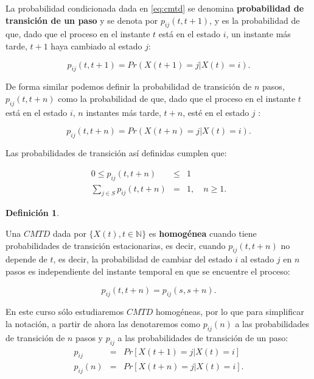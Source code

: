 \documentclass[
]{book}
\newenvironment{yellowbox}{
  \definecolor{shadecolor}{rgb}{210, 180, 140}  
  \color{black}
  \begin{shaded}}
 {\end{shaded}}
\theoremstyle{definition}
\newtheorem{definition}{Definición}[chapter]
\theoremstyle{definition}
\theoremstyle{definition}
\theoremstyle{definition}
\theoremstyle{remark}
\begin{document}
La probabilidad condicionada dada en \eqref{eq:cmtd} se denomina \textbf{probabilidad de transición de un paso} y se denota por \(p_{ij}(t,t+1)\), y es la probabilidad de que, dado que el proceso en el instante \(t\) está en el estado \(i\), un instante más tarde, \(t+1\) haya cambiado al estado \(j\):

\[p_{ij}(t,t+1)=Pr(X(t+1) = j | X(t) = i).\]

De forma similar podemos definir la probabilidad de transición de \(n\) pasos, \(p_{ij}(t,t+n)\) como la probabilidad de que, dado que el proceso en el instante \(t\) está en el estado \(i\), \(n\) instantes más tarde, \(t+n\), esté en el estado \(j\) :

\begin{equation}
p_{ij}(t,t+n)=Pr(X(t+n) = j | X(t) = i).
\label{eq:probtrans}
\end{equation}

Las probabilidades de transición así definidas cumplen que:

\begin{eqnarray*}
0 \leq p_{ij}(t,t+n) &\leq & 1 \\
\sum_{j \in S} p_{ij}(t,t+n) &=& 1, \quad n\geq 1.
\end{eqnarray*}

\begin{yellowbox}

\begin{definition}
\protect\hypertarget{def:CMhomogenea}{}\label{def:CMhomogenea}

Una \(CMTD\) dada por \(\{X(t), t \in \mathbb{N}\}\) es \textbf{homogénea} cuando tiene probabilidades de transición estacionarias, es decir, cuando \(p_{ij}(t, t+n)\) no depende de \(t\), es decir, la probabilidad de cambiar del estado \(i\) al estado \(j\) en \(n\) pasos es independiente del instante temporal en que se encuentre el proceso:

\begin{equation*}
p_{ij}(t, t+n) = p_{ij}(s, s+n).
\end{equation*}

\end{definition}

\end{yellowbox}

En este curso sólo estudiaremos \(CMTD\) homogéneas, por lo que para simplificar la notación, a partir de ahora las denotaremos como \(p_{ij}(n)\) a las probabilidades de transición de \(n\) pasos y \(p_{ij}\) a las probabilidades de transición de un paso: \begin{eqnarray*}
p_{ij} &=& Pr[X(t+1) = j | X(t) = i] \\
p_{ij}(n) &=& Pr[X(t+n) = j | X(t) = i].
\end{eqnarray*}
\end{document}
